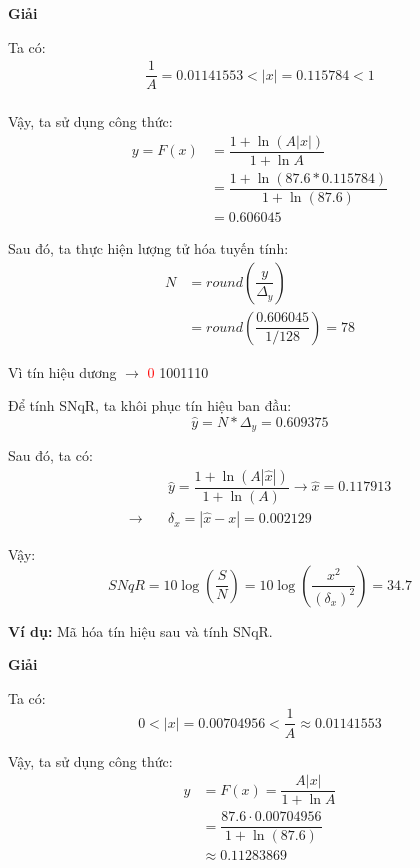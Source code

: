 \begin{center}
    \textbf{Giải}
\end{center}

Ta có:
\[
    \begin{aligned}
        \dfrac{1}{A} = 0.01141553 < |x| = 0.115784 < 1\\[6pt]
    \end{aligned}
\]

Vậy, ta sử dụng công thức:
\[
    \begin{aligned}
        y = F(x) &= \dfrac{1 + \ln(A|x|)}{1 + \ln A}\\[6pt]
          &= \dfrac{1 + \ln(87.6 * 0.115784)}{1 + \ln(87.6)}\\[6pt]
          &= 0.606045
    \end{aligned}
\]

Sau đó, ta thực hiện lượng tử hóa tuyến tính:
\[
    \begin{aligned}
        N &= round\left(\dfrac{y}{\Delta_y}\right)\\[6pt]
          &= round\left(\dfrac{0.606045}{1/128}\right) = 78
    \end{aligned}
\]

Vì tín hiệu dương $\rightarrow$ \textcolor{red}{0} 1001110

Để tính SNqR, ta khôi phục tín hiệu ban đầu:
\[
    \hat{y} = N * \Delta_y = 0.609375
\]

Sau đó, ta có:
\[
    \begin{aligned}
        &\hat{y} = \dfrac{1 + \ln(A|\hat{x}|)}{1 + \ln(A)} \rightarrow \hat{x} = 0.117913\\[6pt]
        \rightarrow \quad &\delta_x = |\hat{x} - x| = 0.002129
    \end{aligned}
\]

Vậy:
\[
    SNqR = 10\log\left(\dfrac{S}{N}\right) = 10 \log\left(\dfrac{x^2}{(\delta_x)^2}\right) = 34.7
\]

\newpage

\noindent\textbf{Ví dụ:} Mã hóa tín hiệu sau và tính SNqR.
\begin{center}
    
\end{center}

\begin{center}
    \textbf{Giải}
\end{center}

Ta có:
\[
    0 < |x| = 0.00704956 < \dfrac{1}{A} \approx 0.01141553
\]

Vậy, ta sử dụng công thức:
\[
    \begin{aligned}
        y &= F(x) = \dfrac{A|x|}{1 + \ln A}\\[6pt]
          &= \dfrac{87.6 \cdot 0.00704956}{1 + \ln(87.6)}\\[6pt]
          &\approx 0.11283869
    \end{aligned}
\]

